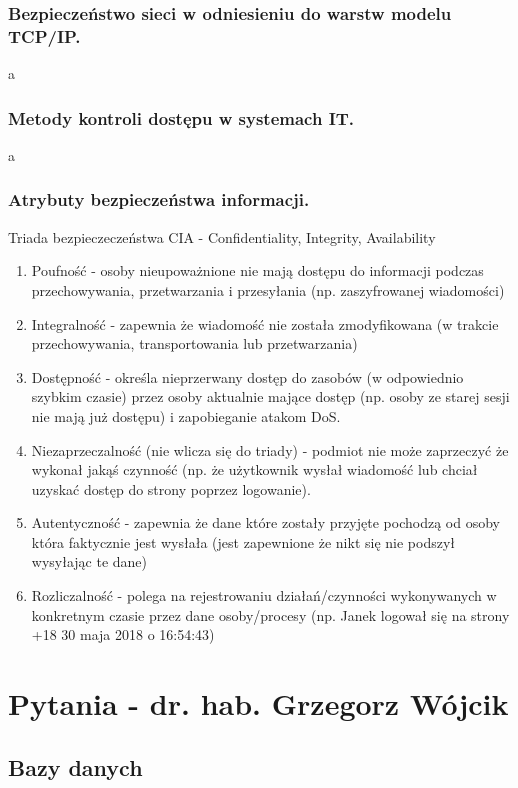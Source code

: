 \documentclass[a4paper,12pt,oneside]{book}
\begin{document}
			\newpage\subsection{\color{red}Bezpieczeństwo sieci w odniesieniu do warstw modelu TCP/IP.}
				a
			\newpage\subsection{\color{red}Metody kontroli dostępu w systemach IT.}
				a
			\newpage\subsection{Atrybuty bezpieczeństwa informacji.}
				Triada bezpieczeczeństwa CIA - Confidentiality, Integrity, Availability
				\begin{enumerate}
					\item Poufność - osoby nieupoważnione nie mają dostępu do informacji podczas
					przechowywania, przetwarzania i przesyłania (np. zaszyfrowanej wiadomości)
					\item Integralność - zapewnia że wiadomość nie została zmodyfikowana (w trakcie
					przechowywania, transportowania lub przetwarzania)
					\item Dostępność - określa nieprzerwany dostęp do zasobów (w odpowiednio szybkim
					czasie) przez osoby aktualnie mające dostęp (np. osoby ze starej sesji nie mają już
					dostępu) i zapobieganie atakom DoS.
					\item Niezaprzeczalność (nie wlicza się do triady) - podmiot nie może zaprzeczyć że
					wykonał jakąś czynność (np. że użytkownik wysłał wiadomość lub chciał uzyskać
					dostęp do strony poprzez logowanie).
					\item Autentyczność - zapewnia że dane które zostały przyjęte pochodzą od osoby która
					faktycznie jest wysłała (jest zapewnione że nikt się nie podszył wysyłając te dane)
					\item Rozliczalność - polega na rejestrowaniu działań/czynności wykonywanych w
					konkretnym czasie przez dane osoby/procesy (np. Janek logował się na strony +18
					30 maja 2018 o 16:54:43)
				\end{enumerate}
	
	\chapter{Pytania - dr. hab. Grzegorz Wójcik}
	
		\section{Bazy danych}
\end{document}
